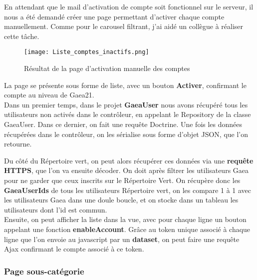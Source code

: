 

En attendant que le mail d'activation de compte soit fonctionnel sur le serveur, il nous a été demandé créer une page permettant d'activer chaque compte manuellement.
Comme pour le carousel filtrant, j'ai aidé un collègue à réaliser cette tâche.

\begin{figure}[H]
    \texttt{[image: Liste\_comptes\_inactifs.png]}
    \caption{Résultat de la page d'activation manuelle des comptes}
\end{figure}

La page se présente sous forme de liste, avec un bouton \textbf{Activer}, confirmant le compte au niveau de Gaea21.\\

Dans un premier temps, dans le projet \textbf{GaeaUser} nous avons récupéré tous les utilisateurs non activés dans le contrôleur, en appelant le Repository de la classe GaeaUser. 
Dans ce dernier, on fait une requête Doctrine. Une fois les données récupérées dans le contrôleur, on les sérialise sous forme d'objet JSON, que l'on retourne.

Du côté du Répertoire vert, on peut alors récupérer ces données via une \textbf{requête HTTPS}, que l'on va ensuite décoder. 
On doit après filtrer les utilisateurs Gaea pour ne garder que ceux inscrits sur le Répertoire Vert. On récupère donc les \textbf{GaeaUserIds} de tous les utilisateurs Répertoire vert, on les compare 1 à 1 avec les utilisateurs Gaea dans une doule boucle, et on stocke dans un tableau les utilisateurs dont l'id est commun.\\

Ensuite, on peut afficher la liste dans la vue, avec pour chaque ligne un bouton appelant une fonction \textbf{enableAccount}. 
Grâce au token unique associé à chaque ligne que l'on envoie au javascript par un \textbf{dataset}, on peut faire une requête Ajax confirmant le compte associé à ce token.


\subsubsection{Page sous-catégorie}

